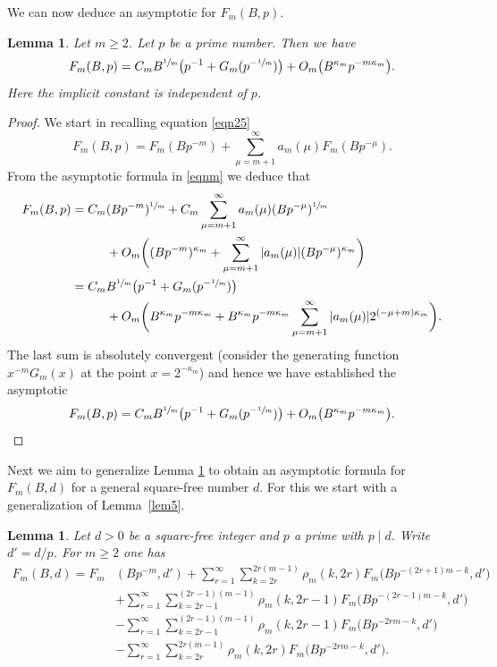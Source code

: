\documentclass[JEP,XML,SOM,Unicode,published]{cedram}
\let\kap\kappa
\newtheorem{lemma}[theorem]{Lemma}
\theoremstyle{definition}
\numberwithin{theorem}{section}
\begin{document}
We can now deduce an asymptotic for $F_m(B,p)$.

\begin{lemma}\label{lem6}
Let $m\geq 2$.
Let $p$ be a prime number. Then we have
\[
F_m(B,p)=C_mB^{\sfrac{1}{m}} \bigl(p^{-1}+G_m(p^{-\sfrac{1}{m}})\bigr)+ O_m\bigl(B^{\kap_m}p^{-m\kap_m}\bigr).
\]
Here the implicit constant is independent of $p$.
\end{lemma}

\begin{proof}
We start in recalling equation \eqref{eqn25}
\begin{equation*}
F_m(B,p) = F_m(Bp^{-m}) +\sum_{\mu=m+1}^\infty a_m(\mu) F_m(Bp^{-\mu}).
\end{equation*}
From the asymptotic formula in \eqref{eqnm} we deduce that
\begin{equation*}
\begin{split}
F_m(B,p) =C_m&(Bp^{-m})^{\sfrac{1}{m}} +C_m\sum_{\mu=m+1}^\infty a_m(\mu) (Bp^{-\mu})^{\sfrac{1}{m}}\\ &+O_m\biggl((Bp^{-m})^{\kap_m}+ \sum_{\mu=m+1}^\infty |a_m(\mu)| (Bp^{-\mu})^{\kap_m} \biggr)\\
= C_m&B^{\sfrac{1}{m}} \bigl(p^{-1}+G_m(p^{-\sfrac{1}{m}})\bigr)\\& +O_m\biggl(B^{\kap_m}p^{-m\kap_m}+B^{\kap_m}p^{-m\kap_m}\sum_{\mu=m+1}^{\infty}|a_m(\mu)|2^{(-\mu+m)\kap_m}\biggr).
\end{split}
\end{equation*}
The last sum is absolutely convergent (consider the generating function $x^{-m}G_m(x)$ at the point $x=2^{-\kap_m}$) and hence we have established the asymptotic
\[
F_m(B,p)=C_mB^{\sfrac{1}{m}} \bigl(p^{-1}+G_m(p^{-\sfrac{1}{m}})\bigr)+ O_m\bigl(B^{\kap_m}p^{-m\kap_m}\bigr). \qedhere
\]
\end{proof}

Next we aim to generalize Lemma \ref{lem6} to obtain an asymptotic formula for $F_m(B,d)$ for a general square-free number $d$. For this we start with a generalization of Lemma~\ref{lem5}.

\begin{lemma}\label{lem7}
Let $d>0$ be a square-free integer and $p$ a prime with $p\mid d$. Write $d'=d/p$. For $m\geq 2$ one has
\begin{equation*}
\begin{split}
F_m(B,d) =F_m&(Bp^{-m},d') +\sum_{r=1}^{\infty} \sum_{k=2r}^{2r(m-1)}\rho_m(k,2r)F_m\bigl(Bp^{-(2r+1)m-k},d'\bigr)\\
&+ \sum_{r=1}^\infty\sum_{k=2r-1}^{(2r-1)(m-1)}\rho_m(k,2r-1)F_m\bigl(Bp^{-(2r-1)m-k},d'\bigr)\\
&-\sum_{r=1}^\infty \sum_{k=2r-1}^{(2r-1)(m-1)}\rho_m(k,2r-1)F_m\bigl(Bp^{-2rm-k},d'\bigr)\\
&-\sum_{r=1}^\infty\sum_{k=2r}^{2r(m-1)}\rho_m(k,2r)F_m\bigl(Bp^{-2rm-k},d'\bigr).
\end{split}
\end{equation*}
\end{lemma}
\end{document}
